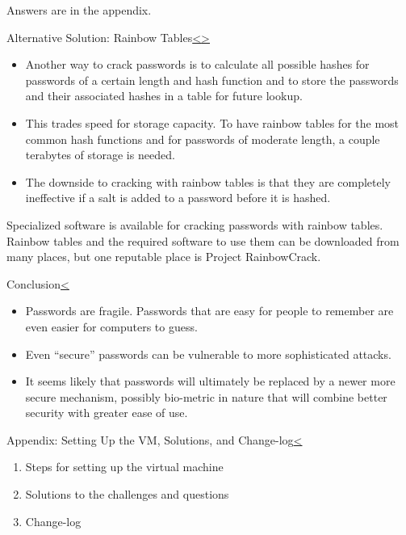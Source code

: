 \documentclass[12pt]{extarticle}
\newenvironment{instructionblock}{\Large\bgroup}{\egroup}
\begin{document}
	Answers are in the appendix.
	
	\pagebreak
	\begin{slide}{Alternative Solution: Rainbow Tables}{\hyperref[slide 16]{\textless}\hyperref[slide 18]{\textgreater}}
		\begin{instructionblock}
			\begin{itemize}
				\item Another way to crack passwords is to calculate all possible hashes for passwords of a certain length and hash function and to store the passwords and their associated hashes in a table for future lookup. 
				\item This trades speed for storage capacity. To have rainbow tables for the most common hash functions and for passwords of moderate length, a couple terabytes of storage is needed. 
				\item The downside to cracking with rainbow tables is that they are completely ineffective if a salt is added to a password before it is hashed.
			\end{itemize}
		\end{instructionblock}
	\end{slide}
	\cite{rainbowcrack}
	\vfill
	Specialized software is available for cracking passwords with rainbow tables. Rainbow tables and the required software to use them can be downloaded from many places, but one reputable place is Project RainbowCrack.\cite{rainbowcrack}
	
	\pagebreak
	\begin{slide}{Conclusion}{\hyperref[slide 17]{\textless}}
		\begin{instructionblock}
			\begin{itemize}
				\item Passwords are fragile.  Passwords that are easy for people to remember are even easier for computers to guess.
				\item Even ``secure'' passwords can be vulnerable to more sophisticated attacks.
				\item It seems likely that passwords will ultimately be replaced by a newer more secure mechanism, possibly bio-metric in nature that will combine better security with greater ease of use.
			\end{itemize}
		\end{instructionblock}
	\end{slide}
	\vfill
	
	\pagebreak
	
	\begin{slide}{Appendix: Setting Up the VM, Solutions, and Change-log}{\hyperref[slide 14]{\textless}}
		\begin{instructionblock}
			\begin{enumerate}
				\item {Steps for setting up the virtual machine}
				\item {Solutions to the challenges and questions}
				
				\item {Change-log}
			\end{enumerate}
		\end{instructionblock}
	\end{slide}
	
\end{document}
